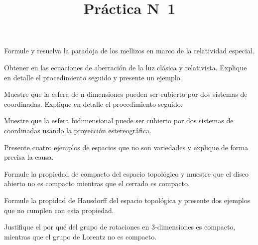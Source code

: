 \documentclass[12pt,a4paper]{practice}
\begin{document}
    \title{Práctica N\textdegree\ 1}
    \maketitle

    \begin{problem}\label{prob:1}
        Formule y resuelva la paradoja de los mellizos en marco de la relatividad especial.
    \end{problem}

    \begin{problem}\label{prob:2}
        Obtener en las ecuaciones de aberración de la luz clásica y relativista. Explique en detalle el procedimiento seguido y presente un ejemplo.
    \end{problem}

    \begin{problem}\label{prob:3}
        Muestre que la esfera de n-dimensiones pueden ser cubierto por dos sistemas de coordinadas. Explique en detalle el procedimiento seguido.    
    \end{problem}

    \begin{problem}\label{prob:4}
        Muestre que la esfera bidimensional puede ser cubierto por dos sistemas de coordinadas usando la proyección estereográfica.
    \end{problem}

    \begin{problem}\label{prob:5}
        Presente cuatro ejemplos de espacios que no son variedades y explique de forma precisa la causa.
    \end{problem}

    \begin{problem}\label{prob:6}
        Formule la propiedad de compacto del espacio topológico y muestre que el disco abierto no es compacto mientras que el cerrado es compacto.
    \end{problem}

    \begin{problem}\label{prob:7}
        Formule la propidad de Hausdorff del espacio topológica y presente dos ejemplos que no cumplen con esta propiedad.
    \end{problem}

    \begin{problem}\label{prob:8}
        Justifique el por qué del grupo de rotaciones en 3-dimensiones es compacto, mientras que el grupo de Lorentz no es compacto.
    \end{problem}
    
    
\end{document}
